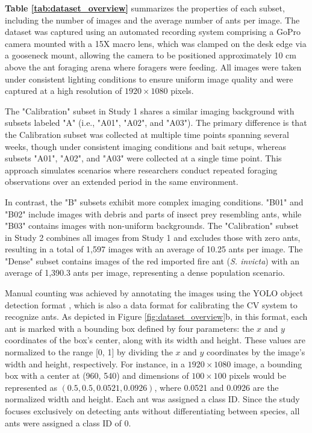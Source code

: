 \textbf{Table \ref{tab:dataset_overview}} summarizes the properties of each subset, including the number of images and the average number of ants per image. The dataset was captured using an automated recording system comprising a GoPro camera mounted with a 15X macro lens, which was clamped on the desk edge via a gooseneck mount, allowing the camera to be positioned approximately 10 cm above the ant foraging arena where foragers were feeding. All images were taken under consistent lighting conditions to ensure uniform image quality and were captured at a high resolution of $1920 \times 1080$ pixels.

The "Calibration" subset in Study 1 shares a similar imaging background with subsets labeled "A" (i.e., "A01", "A02", and "A03"). The primary difference is that the Calibration subset was collected at multiple time points spanning several weeks, though under consistent imaging conditions and bait setups, whereas subsets "A01", "A02", and "A03" were collected at a single time point. This approach simulates scenarios where researchers conduct repeated foraging observations over an extended period in the same environment.

In contrast, the "B" subsets exhibit more complex imaging conditions. "B01" and "B02" include images with debris and parts of insect prey resembling ants, while "B03" contains images with non-uniform backgrounds. The "Calibration" subset in Study 2 combines all images from Study 1 and excludes those with zero ants, resulting in a total of 1,597 images with an average of 10.25 ants per image. The "Dense" subset contains images of the red imported fire ant (\emph{S. invicta}) with an average of 1,390.3 ants per image, representing a dense population scenario.

Manual counting was achieved by annotating the images using the YOLO object detection format \cite{jocher_yolo_2023}, which is also a data format for calibrating the CV system to recognize ants. As depicted in Figure \ref{fig:dataset_overview}b, in this format, each ant is marked with a bounding box defined by four parameters: the $x$ and $y$ coordinates of the box's center, along with its width and height. These values are normalized to the range [0, 1] by dividing the $x$ and $y$ coordinates by the image's width and height, respectively. For instance, in a $1920 \times 1080$ image, a bounding box with a center at (960, 540) and dimensions of $100 \times 100$ pixels would be represented as $(0.5, 0.5, 0.0521, 0.0926)$, where 0.0521 and 0.0926 are the normalized width and height. Each ant was assigned a class ID. Since the study focuses exclusively on detecting ants without differentiating between species, all ants were assigned a class ID of 0.

